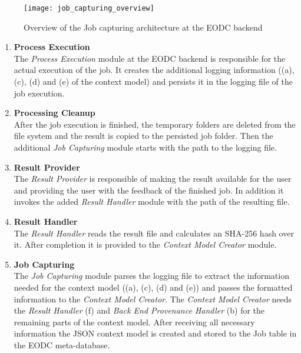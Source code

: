 \documentclass[draft,final]{vutinfth} %
\begin{document}
\begin{figure}[h]
	\centering
	\texttt{[image: job\_capturing\_overview]}
	\caption{Overview of the Job capturing architecture at the EODC backend}
	\label{fig:impljobcapture} %
\end{figure}

\begin{enumerate}
	\item \textbf{Process Execution} \\
	The \textit{Process Execution} module at the EODC backend is responsible for the actual execution of the job. It creates the additional logging information ((a), (c), (d) and (e) of the context model) and persists it in the logging file of the job execution. 
	\item \textbf{Processing Cleanup} \\
	After the job execution is finished, the temporary folders are deleted from the file system and the result is copied to the persisted job folder. Then the additional \textit{Job Capturing} module starts with the path to the logging file.  
	\item \textbf{Result Provider} \\
	The \textit{Result Provider} is responsible of making the result available for the user and providing the user with the feedback of the finished job. In addition it invokes the added \textit{Result Handler} module with the path of the resulting file.
	\item \textbf{Result Handler} \\
	The \textit{Result Handler} reads the result file and calculates an SHA-256 hash over it. After completion it is provided to the \textit{Context Model Creator} module.  
	\item \textbf{Job Capturing} \\
	The \textit{Job Capturing} module parses the logging file to extract the information needed for the context model ((a), (c), (d) and (e)) and passes the formatted information to the \textit{Context Model Creator}. The \textit{Context Model Creator} needs the \textit{Result Handler} (f) and \textit{Back End Provenance Handler} (b) for the remaining parts of the context model. After receiving all necessary information the JSON context model is created and stored to the Job table in the EODC meta-database.    
\end{enumerate}
\end{document}

